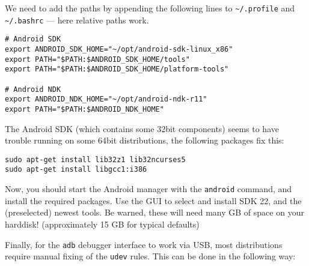 We need to add the paths by appending the following lines to \texttt{\textasciitilde/.profile} and \texttt{\textasciitilde/.bashrc} --- here relative paths work.

\begin{verbatim}
# Android SDK
export ANDROID_SDK_HOME="~/opt/android-sdk-linux_x86"
export PATH="$PATH:$ANDROID_SDK_HOME/tools"
export PATH="$PATH:$ANDROID_SDK_HOME/platform-tools"

# Android NDK
export ANDROID_NDK_HOME="~/opt/android-ndk-r11"
export PATH="$PATH:$ANDROID_NDK_HOME"
\end{verbatim}

The Android SDK (which contains some 32bit components) seems to have trouble running on some 64bit distributions, the following packages fix this:

\begin{verbatim}
sudo apt-get install lib32z1 lib32ncurses5
sudo apt-get install libgcc1:i386
\end{verbatim}

Now, you should start the Android manager with the \texttt{android} command, and install the required packages. Use the GUI to select and install SDK 22, and the (preselected) newest tools. Be warned, these will need many GB of space on your harddisk! (approximately 15 GB for typical defaults)

Finally, for the \texttt{adb} debugger interface to work via USB, most distributions require manual fixing of the \texttt{udev} rules. This can be done in the following way:

